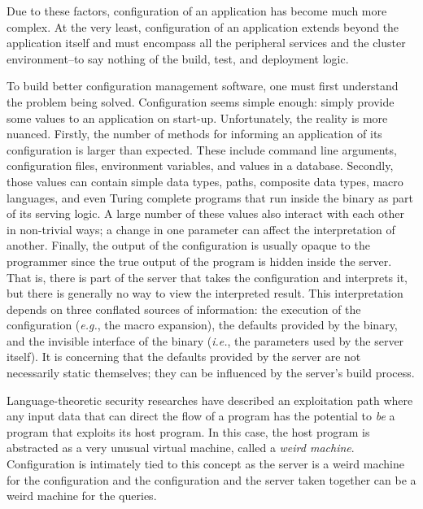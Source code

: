 \documentclass[letterpaper,twocolumn,10pt]{article}
\begin{document}
Due to these factors, configuration of an application has become much more complex. At the very least, configuration of an application extends beyond the application itself and must encompass all the peripheral services and the cluster environment--to say nothing of the build, test, and deployment logic.

To build better configuration management software, one must first understand the problem being solved. Configuration seems simple enough: simply provide some values to an application on start-up. Unfortunately, the reality is more nuanced. Firstly, the number of methods for informing an application of its configuration is larger than expected. These include command line arguments, configuration files, environment variables, and values in a database. Secondly, those values can contain simple data types, paths, composite data types, macro languages, and even Turing complete programs that run inside the binary as part of its serving logic. A large number of these values also interact with each other in non-trivial ways; a change in one parameter can affect the interpretation of another. Finally, the output of the configuration is usually opaque to the programmer since the true output of the program is hidden inside the server. That is, there is part of the server that takes the configuration and interprets it, but there is generally no way to view the interpreted result. This interpretation depends on three conflated sources of information: the execution of the configuration (\emph{e.g.}, the macro expansion), the defaults provided by the binary, and the invisible interface of the binary (\emph{i.e.}, the parameters used by the server itself). It is concerning that the defaults provided by the server are not necessarily static themselves; they can be influenced by the server's build process.

Language-theoretic security researches have described an exploitation path where any input data that can direct the flow of a program has the potential to \emph{be} a program that exploits its host program. In this case, the host program is abstracted as a very unusual virtual machine, called a \emph{weird machine}.\cite{cats,weird} Configuration is intimately tied to this concept as the server is a weird machine for the configuration and the configuration and the server taken together can be a weird machine for the queries.
\end{document}
